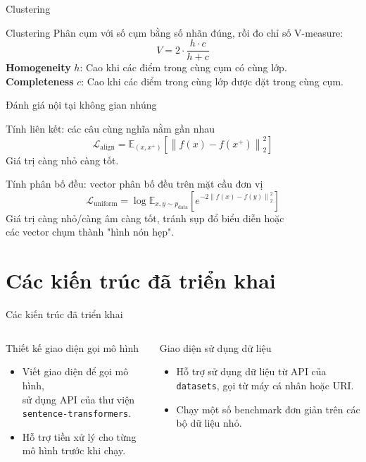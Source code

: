 \documentclass[aspectratio=169,10pt]{beamer}
\begin{document}
\begin{frame}{Clustering}
    \begin{block}{Clustering}
        Phân cụm với số cụm bằng số nhãn đúng, rồi đo chỉ số V-measure:
        \[
            V = 2\cdot\frac{h\cdot c}{h+c}
        \]
        \small
        \textbf{Homogeneity} $h$: Cao khi các điểm trong cùng cụm có cùng lớp.\\
        \textbf{Completeness} $c$: Cao khi các điểm trong cùng lớp được đặt trong cùng cụm.
    \end{block}
\end{frame}

\begin{frame}{Đánh giá nội tại không gian nhúng}
    \begin{block}{Tính liên kết: các câu cùng nghĩa nằm gần nhau}
        \[
            \mathcal{L}_{\mathrm{align}} = \mathbb{E}_{(x,x^+)}\left[\left\|f(x)-f(x^+)\right\|_2^2\right]
        \]
        Giá trị càng nhỏ càng tốt.
    \end{block}
    \begin{block}{Tính phân bố đều: vector phân bố đều trên mặt cầu đơn vị}
        \[
            \mathcal{L}_{\mathrm{uniform}} = \log\mathbb{E}_{x,y\sim p_{\mathrm{data}}}\left[e^{-2\left\|f(x)-f(y)\right\|_2^2}\right]
        \]
        Giá trị càng nhỏ/càng âm càng tốt, tránh sụp đổ biểu diễn hoặc \\ các vector chụm thành "hình nón hẹp".
    \end{block}
\end{frame}

\section{Các kiến trúc đã triển khai}
\begin{frame}{Các kiến trúc đã triển khai}
    \centering
    \begin{columns}[T,onlytextwidth]
        \begin{block}{Thiết kế giao diện gọi mô hình}
            \begin{itemize}
                \item Viết giao diện để gọi mô hình, \\ sử dụng API của thư viện \texttt{sentence-transformers}.
                \item Hỗ trợ tiền xử lý cho từng mô hình trước khi chạy.
            \end{itemize}
        \end{block}
        \begin{block}{Giao diện sử dụng dữ liệu}
            \begin{itemize}
                \item Hỗ trợ sử dụng dữ liệu từ API của \texttt{datasets}, gọi từ máy cá nhân hoặc URI.
                \item Chạy một số benchmark đơn giản trên các bộ dữ liệu nhỏ.
            \end{itemize}
        \end{block}
    \end{columns}
\end{frame}
\end{document}
